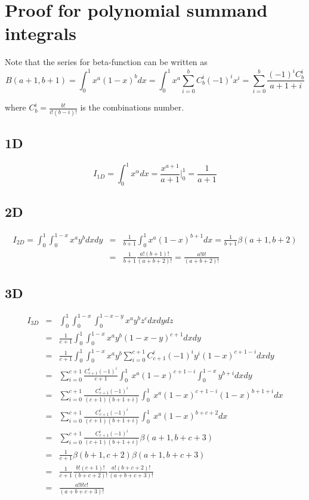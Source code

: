 \section{Proof for polynomial summand integrals}
\noindent
Note that the series for beta-function can be written as
\[B(a+1,b+1) = \int_0^1 x^a (1-x)^b dx = \int_0^1 x^a \sum_{i=0}^b C_b^i (-1)^i x^i = \sum_{i=0}^b \frac{(-1)^i C_b^i}{a+1+i}\]

\noindent
where $C_b^i = \frac{b!}{i!(b-i)!}$ is the combinations number.

\subsection{1D}

\begin{equation}
	I_{1D} = \int_0^1 x^{\alpha} dx = \frac{x^{a + 1}}{a + 1} \biggr |_0^1 = \frac{1}{a + 1}
\end{equation}

\subsection{2D}

\begin{eqnarray*}
	I_{2D} = \int_0^1 \int_0^{1-x} x^{a} y^{b} dx dy
	& = & \frac{1}{b+1} \int_0^1 x^{a} (1-x)^{b+1} dx = \frac{1}{b+1} \beta(a + 1, b + 2) \\
	& = & \frac{1}{b+1} \frac{a!(b+1)!}{(a+b+2)!} = \frac{a!b!}{(a+b+2)!}
\end{eqnarray*}

\subsection{3D}

\begin{eqnarray*}
	I_{3D}
	& = & \int_0^1 \int_0^{1-x} \int_0^{1-x-y} x^a y^b z^c dx dy dz \\
	& = & \frac{1}{c+1} \int_0^1 \int_0^{1-x} x^a y^b (1-x-y)^{c+1} dx dy \\
	& = & \frac{1}{c+1} \int_0^1 \int_0^{1-x} x^a y^b \sum_{i=0}^{c+1} C_{c+1}^i (-1)^i y^i (1-x)^{c+1-i} dx dy \\
	& = & \sum_{i=0}^{c+1} \frac{C_{c+1}^i (-1)^i}{c+1} \int_0^1 \ x^a (1-x)^{c+1-i} \int_0^{1-x} y^{b+i} dx dy \\
	& = & \sum_{i=0}^{c+1} \frac{C_{c+1}^i (-1)^i}{(c+1)(b+1+i)} \int_0^1 \ x^a (1-x)^{c+1-i} (1-x)^{b+1+i} dx \\
	& = & \sum_{i=0}^{c+1} \frac{C_{c+1}^i (-1)^i}{(c+1)(b+1+i)} \int_0^1 \ x^a (1-x)^{b+c+2} dx \\
	& = & \sum_{i=0}^{c+1} \frac{C_{c+1}^i (-1)^i}{(c+1)(b+1+i)} \beta(a+1, b+c+3) \\
	& = & \frac{1}{c+1} \beta(b+1,c+2) \beta(a+1, b+c+3) \\
	& = & \frac{1}{c+1} \frac{b!(c+1)!}{(b+c+2)!} \frac{a! (b+c+2)!}{(a+b+c+3)!} \\
	& = &  \frac{a! b! c!}{(a+b+c+3)!}
\end{eqnarray*}